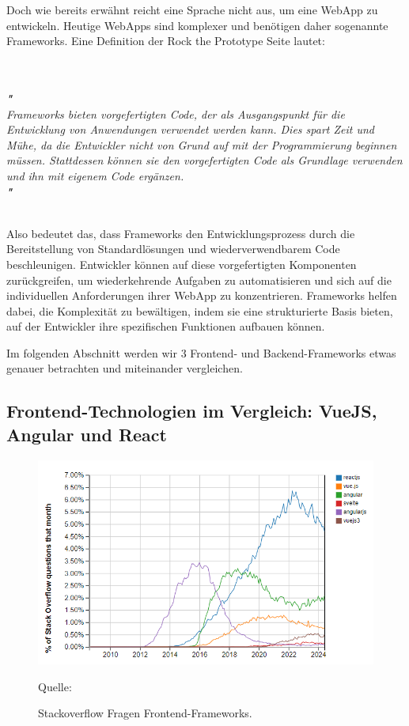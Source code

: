 \documentclass[biblatex]{lni}
\begin{document}
Doch wie bereits erwähnt reicht eine Sprache nicht aus, um eine \ac{WebApp} zu entwickeln.
Heutige \ac{WebApp}s sind komplexer und benötigen daher sogenannte Frameworks.
Eine Definition der Rock the Prototype Seite lautet: \\
\begin{minipage}{\textwidth}
  \textit{
    \\
    \\
    \textbf{"} \\
    Frameworks bieten vorgefertigten Code,
    der als Ausgangspunkt für die Entwicklung von Anwendungen verwendet werden kann. Dies spart Zeit und Mühe,
    da die Entwickler nicht von Grund auf mit der Programmierung beginnen müssen.
    Stattdessen können sie den vorgefertigten Code als Grundlage verwenden und ihn mit eigenem Code ergänzen.
    \\
    \textbf{"} \\
    \Cite{RtP}
    \\
  }
\end{minipage}

Also bedeutet das,
dass Frameworks den Entwicklungsprozess durch die Bereitstellung von Standardlösungen und wiederverwendbarem Code beschleunigen.
Entwickler können auf diese vorgefertigten Komponenten zurückgreifen,
um wiederkehrende Aufgaben zu automatisieren und sich auf die individuellen Anforderungen ihrer \ac{WebApp} zu konzentrieren.
Frameworks helfen dabei, die Komplexität zu bewältigen,
indem sie eine strukturierte Basis bieten, auf der Entwickler ihre spezifischen Funktionen aufbauen können.

Im folgenden Abschnitt werden wir 3 Frontend- und Backend-Frameworks etwas genauer betrachten und miteinander vergleichen.

\subsection{Frontend-Technologien im Vergleich: VueJS, Angular und React}

\begin{figure}
  \centering
  \includegraphics[width=.8\textwidth]{fetrends}
  \caption{Stackoverflow Fragen Frontend-Frameworks.}
  \label{fig:fetrends}
  \vspace{-0.3cm}
  \begin{center}
    \footnotesize Quelle: \cite{SOTrend}
  \end{center}
\end{figure}
\end{document}
